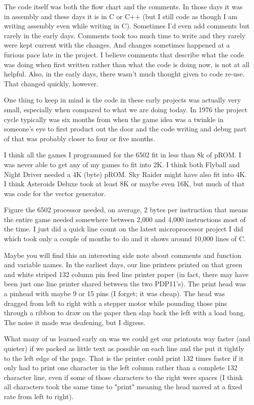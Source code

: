 The code itself was both the flow chart and the comments. In those days it was in assembly and these days it is in C or C++ (but I still code as though I am writing assembly even while writing in C). Sometimes I'd even add comments but rarely in the early days. Comments took too much time to write and they rarely were kept current with the changes. And changes sometimes happened at a furious pace late in the project. I believe comments that describe what the code was doing when first written rather than what the code is doing now, is not at all helpful. Also, in the early days, there wasn't much thought given to code re-use. That changed quickly, however.

One thing to keep in mind is the code in these early projects was actually very small, especially when compared to what we are doing today. In 1976 the project cycle typically was six months from when the game idea was a twinkle in someone's eye to first product out the door and the code writing and debug part of that was probably closer to four or five months. 

I think all the games I programmed for the 6502 fit in less than 8k of pROM. I was never able to get any of my games to fit into 2K. I think both Flyball and Night Driver needed a 4K (byte) pROM. Sky Raider might have also fit into 4K. I think Asteroids Deluxe took at least 8K or maybe even 16K, but much of that was code for the vector generator. 

Figure the 6502 processor needed, on average, 2 bytes per instruction that means the entire game needed somewhere between 2,000 and 4,000 instructions most of the time. I just did a quick line count on the latest microprocessor project I did which took only a couple of months to do and it shows around 10,000 lines of C. 

Maybe you will find this an interesting side note about comments and function and variable names. In the earliest days, our line printers printed on that green and white striped 132 column pin feed line printer paper (in fact, there may have been just one line printer shared between the two PDP11's). The print head was a pinhead with maybe 9 or 15 pins (I forget; it was cheap). The head was dragged from left to right with a stepper motor while pounding those pins through a ribbon to draw on the paper then slap back the left with a load bang. The noise it made was deafening, but I digress. 

What many of us learned early on was we could get our printouts way faster (and quieter) if we packed as little text as possible on each line and the put it tightly to the left edge of the page. That is the printer could print 132 times faster if it only had to print one character in the left column rather than a complete 132 character line, even if some of those characters to the right were spaces (I think all characters took the same time to "print" meaning the head moved at a fixed rate from left to right).


